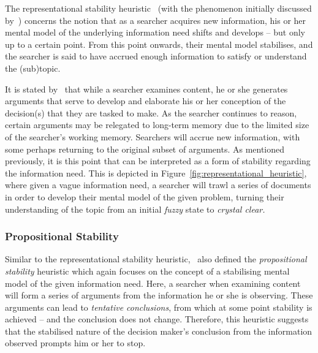 The representational stability heuristic~\citep{nickles1995judgment} (with the phenomenon initially discussed by~\cite{yates1982toward}) concerns the notion that as a searcher acquires new information, his or her mental model of the underlying information need shifts and develops -- but only up to a certain point. From this point onwards, their mental model stabilises, and the searcher is said to have accrued enough information to satisfy or understand the (sub)topic.

It is stated by~\cite{nickles1995judgment} that while a searcher examines content, he or she generates arguments that serve to develop and elaborate his or her conception of the decision(s) that they are tasked to make. As the searcher continues to reason, certain arguments may be relegated to long-term memory due to the limited size of the searcher's working memory. Searchers will accrue new information, with some perhaps returning to the original subset of arguments. As mentioned previously, it is this point that can be interpreted as a form of stability regarding the information need. This is depicted in Figure~\ref{fig:representational_heuristic}, where given a vague information need, a searcher will trawl a series of documents in order to develop their mental model of the given problem, turning their understanding of the topic from an initial \emph{fuzzy} state to \emph{crystal clear.}

\vspace*{-4mm}
\subsubsection{Propositional Stability}\label{sec:stopping_background:heuristics:propositional}
Similar to the representational stability heuristic,~\cite{nickles1995judgment} also defined the \emph{propositional stability} heuristic which again focuses on the concept of a stabilising mental model of the given information need. Here, a searcher when examining content will form a series of arguments from the information he or she is observing. These arguments can lead to \emph{tentative conclusions}, from which at some point stability is achieved -- and the conclusion does not change. Therefore, this heuristic suggests that the stabilised nature of the decision maker's conclusion from the information observed prompts him or her to stop.

\vspace*{-4mm}
